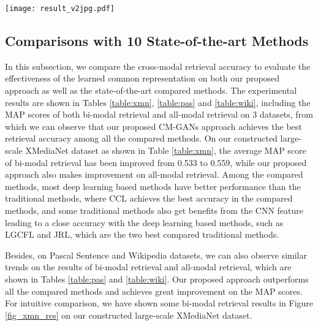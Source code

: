 \documentclass[journal]{IEEEtran}
\begin{document}
\begin{figure*}[!t]
	\centering
	\texttt{[image: result\_v2jpg.pdf]}
	\caption{Examples of the bi-modal retrieval results on XMediaNet dataset by our proposed CM-GANs approach as well as the best compared deep learning based method CCL \cite{peng2017ccl} and the best compared traditional method LGCFL \cite{DBLP:journals/tmm/KangXLXP15}. The retrieval results with green borders are correct, while those with red borders are wrong in these examples.
	}
	\label{fig_xmn_res}
\end{figure*}



\subsection{Comparisons with 10 State-of-the-art Methods}

In this subsection, we compare the cross-modal retrieval accuracy to evaluate the effectiveness of the learned common representation on both our proposed approach as well as the state-of-the-art compared methods. The experimental results are shown in Tables \ref{table:xmn}, \ref{table:pas} and \ref{table:wiki}, including the MAP scores of both bi-modal retrieval and all-modal retrieval on 3 datasets, from which we can observe that our proposed CM-GANs approach achieves the best retrieval accuracy among all the compared methods. On our constructed large-scale XMediaNet dataset as shown in Table \ref{table:xmn}, the average MAP score of bi-modal retrieval has been improved from 0.533 to 0.559, while our proposed approach also makes improvement on all-modal retrieval.
Among the compared methods, most deep learning based methods have better performance than the traditional methods, where CCL achieves the best accuracy in the compared methods, and some traditional methods also get benefits from the CNN feature leading to a close accuracy with the deep learning based methods, such as LGCFL and JRL, which are the two best compared traditional methods.

Besides, on Pascal Sentence and Wikipedia datasets, we can also observe similar trends on the results of bi-modal retrieval and all-modal retrieval, which are shown in Tables \ref{table:pas} and \ref{table:wiki}. Our proposed approach outperforms all the compared methods and achieves great improvement on the MAP scores. 
For intuitive comparison, we have shown some bi-modal retrieval results in Figure \ref{fig_xmn_res} on our constructed large-scale XMediaNet dataset.
\end{document}

